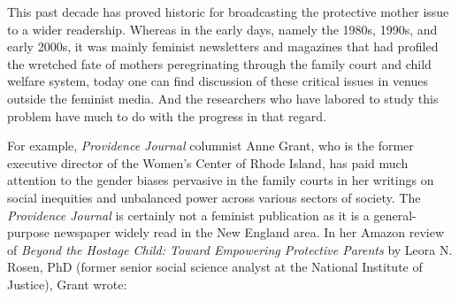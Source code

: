 \vspace{4em}


\noindent{}This past decade has proved historic for broadcasting the protective mother issue to a wider readership. Whereas in the early days,
namely the 1980s, 1990s, and early 2000s, it was mainly feminist newsletters and magazines that had profiled the wretched fate of mothers
peregrinating through the family court and child welfare system, today
one can find discussion of these critical issues in venues outside the feminist media. And the researchers who have labored to study this problem
have much to do with the progress in that regard. \pfl{}

For example, \textit{Providence Journal} columnist Anne Grant, who is the
former executive director of the Women's Center of Rhode Island, has
paid much attention to the gender biases pervasive in the family courts
in her writings on social inequities and unbalanced power across various sectors of society. The \textit{Providence Journal} is certainly not a feminist
publication as it is a general-purpose newspaper widely read in the New
England area. In her Amazon review of \textit{Beyond the
Hostage Child: Toward Empowering Protective Parents}
by Leora N. Rosen, PhD (former senior social science 
analyst at the National Institute of Justice), Grant wrote:

\vspace{-1em}

